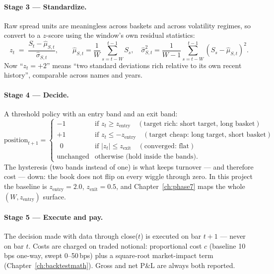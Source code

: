 \paragraph{Stage 3 --- Standardize.} Raw spread units are meaningless across baskets and
across volatility regimes, so convert to a $z$-score using the window's own residual
statistics:
\begin{equation}
  z_t \;=\; \frac{S_t - \hat\mu_{S,t}}{\hat\sigma_{S,t}},
  \qquad
  \hat\mu_{S,t}=\frac{1}{W}\sum_{s=t-W}^{t-1}S_s,\quad
  \hat\sigma^2_{S,t}=\frac{1}{W-1}\sum_{s=t-W}^{t-1}(S_s-\hat\mu_{S,t})^2 .
  \label{eq:saa:z}
\end{equation}
Now ``$z_t=+2$'' means ``two standard deviations rich relative to its own recent
history'', comparable across names and years.

\paragraph{Stage 4 --- Decide.} A threshold policy with an entry band and an exit band:
\begin{equation}
  \text{position}_{t+1} =
  \begin{cases}
    -1 & \text{if } z_t \ge z_{\text{entry}} \quad(\text{target rich: short target, long basket})\\
    +1 & \text{if } z_t \le -z_{\text{entry}} \quad(\text{target cheap: long target, short basket})\\
    \ \ 0 & \text{if } \lvert z_t\rvert \le z_{\text{exit}} \quad(\text{converged: flat})\\
    \text{unchanged} & \text{otherwise (hold inside the bands)}.
  \end{cases}
  \label{eq:saa:policy}
\end{equation}
The hysteresis (two bands instead of one) is what keeps turnover --- and therefore cost
--- down: the book does not flip on every wiggle through zero. In this project the
baseline is $z_{\text{entry}}=2.0$, $z_{\text{exit}}=0.5$, and
Chapter~\ref{ch:phase7} maps the whole $(W, z_{\text{entry}})$ surface.

\paragraph{Stage 5 --- Execute and pay.} The decision made with data through close($t$)
is executed on bar $t+1$ --- never on bar $t$. Costs are charged on traded notional:
proportional cost $c$ (baseline 10\,bps one-way, swept 0--50\,bps) plus a square-root
market-impact term (Chapter~\ref{ch:backtestmath}). Gross and net P\&L are always both
reported.

